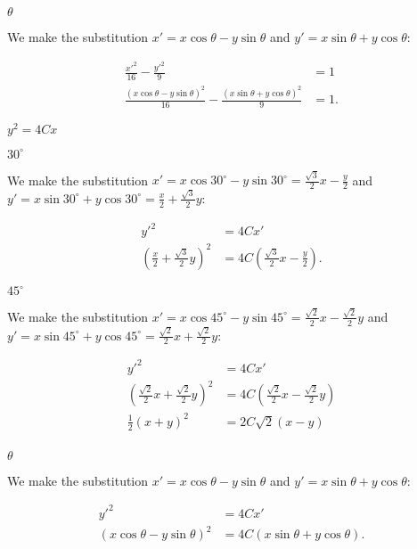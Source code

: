 \documentclass[../gatm_answers.tex]{subfiles}
\begin{document}
\begin{iinner_problem}
\item $\theta$
\end{iinner_problem}

We make the substitution $x'=x \cos \theta - y\sin \theta$ and $y'=x\sin \theta + y\cos \theta$:

\begin{align*}
\frac{x'^2}{16}-\frac{y'^2}{9} &= 1 \\
\frac{\left(x \cos \theta - y\sin \theta\right)^2}{16} - \frac{\left(x\sin \theta + y\cos \theta\right)^2}{9} &= 1.
\end{align*}

\begin{inner_problem}
\item $y^2=4Cx$
\end{inner_problem}

\begin{iinner_problem}[start=1]
\item $30^\circ$
\end{iinner_problem}

We make the substitution $x'=x \cos 30^\circ - y\sin 30^\circ=\frac{\sqrt{3}}{2}x-\frac{y}{2}$ and $y'=x\sin 30^\circ + y\cos 30^\circ=\frac{x}{2}+\frac{\sqrt{3}}{2}y$:

\begin{align*}
y'^2&=4Cx' \\
\left(\frac{x}{2}+\frac{\sqrt{3}}{2}y\right)^2 &= 4C\left(\frac{\sqrt{3}}{2}x-\frac{y}{2}\right).
\end{align*}

\begin{iinner_problem}
\item $45^\circ$
\end{iinner_problem}

We make the substitution $x'=x \cos 45^\circ - y\sin 45^\circ=\frac{\sqrt{2}}{2}x-\frac{\sqrt{2}}{2}y$ and $y'=x\sin 45^\circ + y\cos 45^\circ=\frac{\sqrt{2}}{2}x+\frac{\sqrt{2}}{2}y$:

\begin{align*}
y'^2&=4Cx' \\
\left(\frac{\sqrt{2}}{2}x+\frac{\sqrt{2}}{2}y\right)^2 &= 4C\left(\frac{\sqrt{2}}{2}x-\frac{\sqrt{2}}{2}y\right) \\
\frac{1}{2}(x+y)^2 &= 2C\sqrt{2}(x-y) \\
\end{align*}

\begin{iinner_problem}
\item $\theta$
\end{iinner_problem}

We make the substitution $x'=x \cos \theta - y\sin \theta$ and $y'=x\sin \theta + y\cos \theta$:

\begin{align*}
y'^2&=4Cx' \\
\left(x \cos \theta - y\sin \theta\right)^2 &= 4C\left(x\sin \theta + y\cos \theta\right).
\end{align*}
\end{document}
